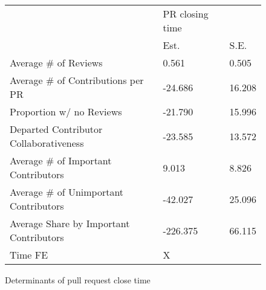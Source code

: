 \begin{figure}[!htbp]
\centering
{\small
\begin{tabular}{lll}
\hline
& PR closing time &  \\ \cmidrule(lr){2-3}
& Est. & S.E. \\ \hline
Average # of Reviews & 0.561 & 0.505 \\
Average # of Contributions per PR & -24.686 & 16.208 \\
Proportion w/ no Reviews & -21.790 & 15.996 \\
Departed Contributor Collaborativeness & -23.585 & 13.572 \\
Average # of Important Contributors & 9.013 & 8.826 \\
Average # of Unimportant Contributors & -42.027 & 25.096 \\
Average Share by Important Contributors & -226.375 & 66.115 \\
\hdashline
Time FE & X &  \\
\hline
\end{tabular}
}
\caption{Determinants of pull request close time}
\label{fig:close_time_regression}
\end{figure}

